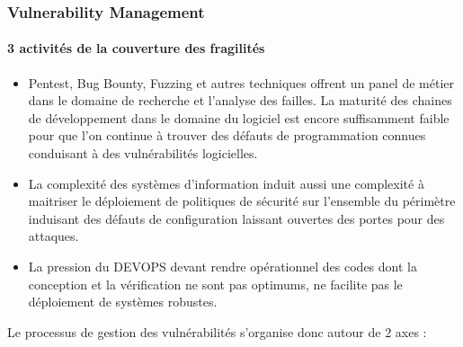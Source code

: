 \begin{frame}
\frametitle<presentation>{Vulnerability Management}
\framesubtitle<presentation>{3 activités de la couverture des fragilités}
\begin{itemize}
  \item Pentest, Bug Bounty, Fuzzing et autres techniques offrent un panel de métier dans le domaine de recherche et l'analyse des failles. La maturité des chaines de développement dans le domaine du logiciel est encore suffisamment faible pour que l'on continue à trouver des défauts de programmation connues conduisant à des  vulnérabilités  logicielles.
  \item La complexité des systèmes d'information induit aussi une complexité à maitriser le déploiement de politiques de sécurité sur l'ensemble du périmètre induisant des défauts de configuration laissant ouvertes des portes pour des attaques. 
  \item La pression du DEVOPS devant rendre opérationnel des codes dont la conception et la vérification ne sont pas optimums, ne facilite pas le déploiement de systèmes robustes.
\end{itemize}
\end{frame}

Le processus de gestion des vulnérabilités     s'organise donc autour de 2 axes  :

